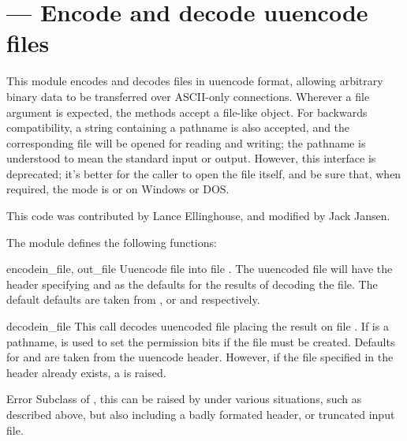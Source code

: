 \section{ ---
         Encode and decode uuencode files}



This module encodes and decodes files in uuencode format, allowing
arbitrary binary data to be transferred over ASCII-only connections.
Wherever a file argument is expected, the methods accept a file-like
object.  For backwards compatibility, a string containing a pathname
is also accepted, and the corresponding file will be opened for
reading and writing; the pathname  is understood to mean the
standard input or output.  However, this interface is deprecated; it's
better for the caller to open the file itself, and be sure that, when
required, the mode is  or  on Windows or DOS.

This code was contributed by Lance Ellinghouse, and modified by Jack
Jansen.

The  module defines the following functions:

\begin{funcdesc}{encode}{in_file, out_file}
  Uuencode file  into file .  The uuencoded
  file will have the header specifying  and  as
  the defaults for the results of decoding the file. The default
  defaults are taken from , or  and 
  respectively.
\end{funcdesc}

\begin{funcdesc}{decode}{in_file}
  This call decodes uuencoded file  placing the result on
  file . If  is a pathname,  is
  used to set the permission bits if the file must be
  created. Defaults for  and  are taken from
  the uuencode header.  However, if the file specified in the header
  already exists, a  is raised.
\end{funcdesc}

\begin{excclassdesc}{Error}{}
  Subclass of , this can be raised by
   under various situations, such as described
  above, but also including a badly formated header, or truncated
  input file.
\end{excclassdesc}

\begin{seealso}
\end{seealso}
